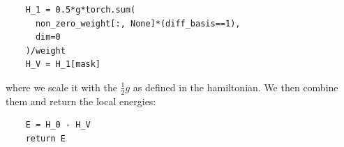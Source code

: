 \begin{verbatim}
    H_1 = 0.5*g*torch.sum(
      non_zero_weight[:, None]*(diff_basis==1),
      dim=0
    )/weight
    H_V = H_1[mask]
\end{verbatim}

where we scale it with the $\frac{1}{2}g$ as defined in the hamiltonian. We then combine them and return the local energies:

\begin{verbatim}
    E = H_0 - H_V
    return E
\end{verbatim}


